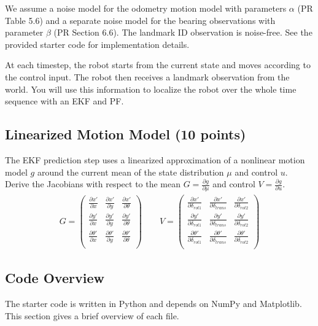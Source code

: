 \documentclass{article}
\newcommand{\pderiv}[2]{\frac{\partial #1}{\partial #2}}
\newcommand{\?}{\stackrel{?}{=}}
\begin{document}
We assume a noise model for the odometry motion model with parameters $\alpha$ (PR Table 5.6) and a separate noise model for the bearing observations with parameter $\beta$ (PR Section 6.6).
The landmark ID observation is noise-free.
See the provided starter code for implementation details.

At each timestep, the robot starts from the current state and moves according to the control input.
The robot then receives a landmark observation from the world.
You will use this information to localize the robot over the whole time sequence with an EKF and PF.


\subsection{Linearized Motion Model (10 points)}

The EKF prediction step uses a linearized approximation of a nonlinear motion model $g$ around the current mean of the state distribution $\mu$ and control $u$.
Derive the Jacobians with respect to the mean $G = \pderiv{g}{\mu}$ and control $V = \pderiv{g}{u}$.
\begin{align*}
  G = \begin{pmatrix}
    \pderiv{x'}     {x} & \pderiv{x'}     {y} & \pderiv{x'}     {\theta} \\
    \pderiv{y'}     {x} & \pderiv{y'}     {y} & \pderiv{y'}     {\theta} \\
    \pderiv{\theta'}{x} & \pderiv{\theta'}{y} & \pderiv{\theta'}{\theta} \\
  \end{pmatrix}\qquad
  V = \begin{pmatrix}
    \pderiv{x'}     {\delta_{rot1}} & \pderiv{x'}     {\delta_{trans}} & \pderiv{x'}     {\delta_{rot2}} \\
    \pderiv{y'}     {\delta_{rot1}} & \pderiv{y'}     {\delta_{trans}} & \pderiv{y'}     {\delta_{rot2}} \\
    \pderiv{\theta'}{\delta_{rot1}} & \pderiv{\theta'}{\delta_{trans}} & \pderiv{\theta'}{\delta_{rot2}} \\
  \end{pmatrix}
\end{align*}


\subsection*{Code Overview}

The starter code is written in Python and depends on NumPy and Matplotlib.
This section gives a brief overview of each file.
\end{document}
